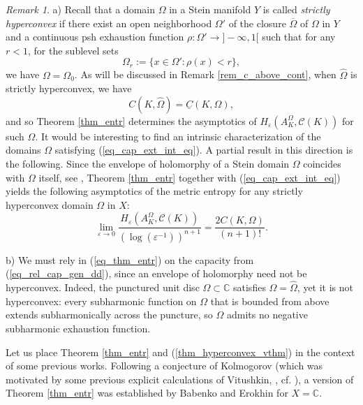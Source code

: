 \documentclass[12pt]{article}
\numberwithin{equation}{section}
\theoremstyle{theorem}
\theoremstyle{definition}
\theoremstyle{remark}
\newtheorem{rem}[thm]{Remark}
\newcommand{\comp}{\mathbb{C}}
\begin{document}
	\begin{rem}
		a) Recall that a domain $\Omega$ in a Stein manifold $Y$ is called \textit{strictly hyperconvex} if there exist an open neighborhood $\Omega'$ of the closure $\overline{\Omega}$ of $\Omega$ in $Y$ and a continuous psh exhaustion function $\rho: \Omega' \to ]- \infty, 1[$ such that for any $r < 1$, for the sublevel sets
		\begin{equation}\label{eq_sublevel}
			\Omega_r := \{x \in \Omega' : \rho(x) < r \},
		\end{equation}
		we have $\Omega = \Omega_0$.
		As will be discussed in Remark \ref{rem_c_above_cont}, when $\widehat{\Omega}$ is strictly hyperconvex, we have
		\begin{equation}\label{eq_cap_ext_int_eq}
			C(K, \widehat{\Omega})
			=
			\underline{C}(K, \Omega),
		\end{equation}
		and so Theorem \ref{thm_entr} determines the asymptotics of $H_{\varepsilon}(A_K^{\Omega}, \mathscr{C}(K))$ for such $\Omega$.
		It would be interesting to find an intrinsic characterization of the domains $\Omega$ satisfying (\ref{eq_cap_ext_int_eq}). 
		A partial result in this direction is the following. 
		Since the envelope of holomorphy of a Stein domain $\Omega$ coincides with $\Omega$ itself, see \cite[Theorem 5.4.2]{Hormander}, Theorem \ref{thm_entr} together with (\ref{eq_cap_ext_int_eq}) yields the following asymptotics of the metric entropy for any strictly hyperconvex domain $\Omega$ in $X$:
		\begin{equation}\label{thm_hyperconvex_vthm}
			\lim_{\varepsilon \to 0}
			\frac{H_{\varepsilon}(A_K^{\Omega}, \mathscr{C}(K))}{(\log(\varepsilon^{-1}))^{n + 1}}
			=
			\frac{2 C(K, \Omega)}{(n + 1)!}.
		\end{equation}
		\par 
		b) We must rely in (\ref{eq_thm_entr}) on the capacity from (\ref{eq_rel_cap_gen_dd}), since an envelope of holomorphy need not be hyperconvex. 
		Indeed, the punctured unit disc $\Omega \subset \comp$ satisfies $\Omega = \widehat{\Omega}$, yet it is not hyperconvex: every subharmonic function on $\Omega$ that is bounded from above extends subharmonically  across the puncture, so $\Omega$ admits no negative subharmonic exhaustion function.
	\end{rem}
	\par 
	Let us place Theorem \ref{thm_entr} and (\ref{thm_hyperconvex_vthm}) in the context of some previous works.
	Following a conjecture of Kolmogorov (which was motivated by some previous explicit calculations of Vitushkin, \cite{VitushkinEntr}, cf. \cite[p. 134]{KolmSelWorksIII}), a version of Theorem \ref{thm_entr} was established by Babenko \cite{Babenko} and Erokhin \cite{Erokhin} for $X = \comp$.
\end{document}
